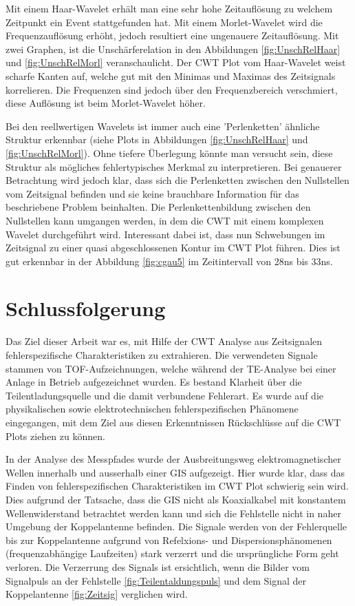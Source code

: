 \begin{refsection}
Mit einem Haar-Wavelet erhält man eine sehr hohe Zeitauflösung zu welchem Zeitpunkt ein Event stattgefunden hat.
Mit einem Morlet-Wavelet wird die Frequenzauflösung erhöht, jedoch resultiert eine ungenauere Zeitauflösung.
Mit zwei Graphen, ist die Unschärferelation in den Abbildungen \ref{fig:UnschRelHaar} und \ref{fig:UnschRelMorl} veranschaulicht. 
Der CWT Plot vom Haar-Wavelet weist scharfe Kanten auf, welche gut mit den Minimas und Maximas des Zeitsignals korrelieren.
Die Frequenzen sind jedoch über den Frequenzbereich verschmiert, diese Auflösung ist beim Morlet-Wavelet höher.

Bei den reellwertigen Wavelets ist immer auch eine 'Perlenketten' ähnliche Struktur erkennbar (siehe Plots in Abbildungen \ref{fig:UnschRelHaar} und \ref{fig:UnschRelMorl}).
Ohne tiefere Überlegung könnte man versucht sein, diese Struktur als mögliches fehlertypisches Merkmal zu interpretieren. 
Bei genauerer Betrachtung wird jedoch klar, dass sich die Perlenketten zwischen den Nullstellen vom Zeitsignal befinden und sie keine brauchbare Information für das beschriebene Problem beinhalten.
Die Perlenkettenbildung zwischen den Nullstellen kann umgangen werden, in dem die CWT mit einem komplexen Wavelet durchgeführt wird.
Interessant dabei ist, dass nun Schwebungen im Zeitsignal zu einer quasi abgeschlossenen Kontur im CWT Plot führen.
Dies ist gut erkennbar in der Abbildung \ref{fig:cgau5} im Zeitintervall von 28ns bis 33ns.

\section{Schlussfolgerung}
Das Ziel dieser Arbeit war es, mit Hilfe der CWT Analyse aus Zeitsignalen fehlerspezifische Charakteristiken zu extrahieren.
Die verwendeten Signale stammen von TOF-Aufzeichnungen, welche während der TE-Analyse bei einer Anlage in Betrieb aufgezeichnet wurden.
Es bestand Klarheit über die Teilentladungsquelle und die damit verbundene Fehlerart. 
Es wurde auf die physikalischen sowie elektrotechnischen fehlerspezifischen Phänomene eingegangen, mit dem Ziel aus diesen Erkenntnissen Rückschlüsse auf die CWT Plots ziehen zu können.

In der Analyse des Messpfades wurde der Ausbreitungsweg elektromagnetischer Wellen innerhalb und ausserhalb einer GIS aufgezeigt.
Hier wurde klar, dass das Finden von fehlerspezifischen Charakteristiken im CWT Plot schwierig sein wird.
Dies aufgrund der Tatsache, dass die GIS nicht als Koaxialkabel mit konstantem Wellenwiderstand betrachtet werden kann und sich die Fehlstelle nicht in naher Umgebung der Koppelantenne befinden.
Die Signale werden von der Fehlerquelle bis zur Koppelantenne aufgrund von Refelxions- und Dispersionsphänomenen (frequenzabhängige Laufzeiten) stark verzerrt und die ursprüngliche Form geht verloren.
Die Verzerrung des Signals ist ersichtlich, wenn die Bilder vom Signalpuls an der Fehlstelle \ref{fig:Teilentaldungspuls} und dem Signal der Koppelantenne \ref{fig:Zeitsig} verglichen wird.


\end{refsection}
